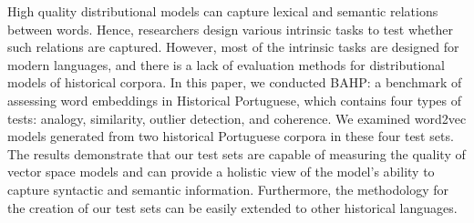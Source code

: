 High quality distributional models can capture lexical and semantic relations between words. Hence, researchers design various intrinsic tasks to test whether such relations are captured. However, most of the intrinsic tasks are designed for modern languages, and there is a lack of evaluation methods for distributional models of historical corpora. In this paper, we conducted BAHP: a benchmark of assessing word embeddings in Historical Portuguese, which contains four types of tests: analogy, similarity, outlier detection, and coherence. We examined word2vec models generated from two historical Portuguese corpora in these four test sets. The results demonstrate that our test sets are capable of measuring the quality of vector space models and can provide a holistic view of the model's ability to capture syntactic and semantic information. Furthermore, the methodology for the creation of our test sets can be easily extended to other historical languages.
